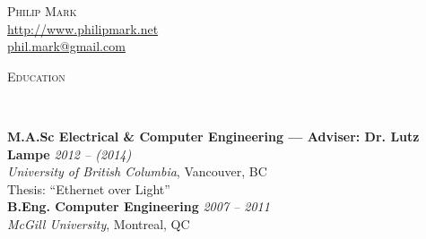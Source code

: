 \documentclass[letterpaper]{article}
\newenvironment{changemargin}[2]{%
  \begin{list}{}{%
    \setlength{\topsep}{0pt}%
    \setlength{\leftmargin}{#1}%
    \setlength{\rightmargin}{#2}%
    \setlength{\listparindent}{\parindent}%
    \setlength{\itemindent}{\parindent}%
    \setlength{\parsep}{\parskip}%
  }%
  \item[]}{\end{list}
}
\newcommand{\lineover}{
  \begin{changemargin}{-0.05in}{-0.05in}
    \vspace*{-8pt}
    \hrulefill \\
    \vspace*{-2pt}
  \end{changemargin}
}
\renewcommand{\section}[1]{
  \begin{changemargin}{-0.5in}{-0.5in}
    \normalsize \scshape{#1}\\
    \lineover
  \end{changemargin}
}
\newcommand{\contact}[3]{
  \begin{changemargin}{-0.5in}{-0.5in}
    \begin{center}
      {\LARGE \scshape {#1}}\\ \smallskip
      {\url{#2}}\\ \smallskip
      {\href{mailto:#3}{#3}}\\ \smallskip
    \end{center}
  \end{changemargin}
}
\newenvironment{body} {
  \vspace{2pt}
  \begin{changemargin}{-0.25in}{-0.5in}
    }{
  \end{changemargin}
}
\begin{document}
\contact{Philip Mark}{http://www.philipmark.net}{phil.mark@gmail.com}

% 
% 

\section{Education}
\begin{body}
\textbf{M.A.Sc Electrical \& Computer Engineering --- Adviser: Dr. Lutz Lampe}
\hfill \emph{2012 -- (2014)}{} \\
\emph{University of British Columbia}, Vancouver, BC \\
Thesis: ``Ethernet over Light''\\ %
\medskip
\textbf{B.Eng. Computer Engineering} \hfill \emph{2007 -- 2011} \\ \emph{McGill
University}, Montreal, QC \\
\end{body}
\bigskip

\end{document}
